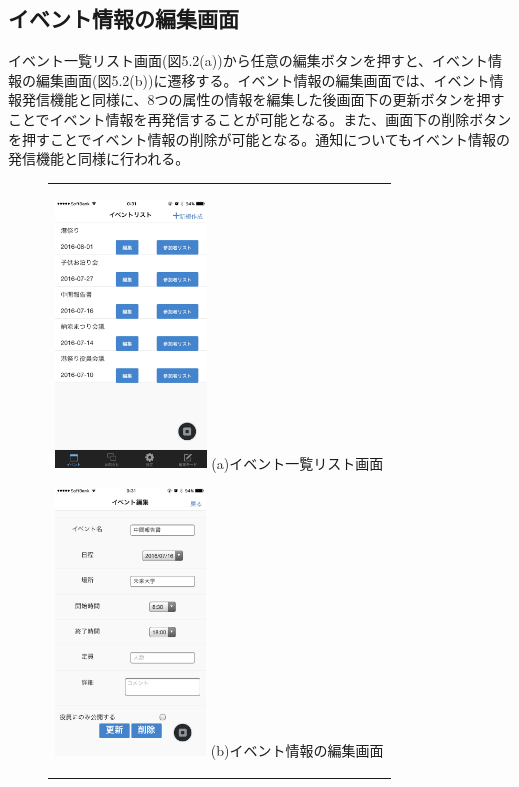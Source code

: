 \subsection{イベント情報の編集画面}%
イベント一覧リスト画面(図5.2(a))から任意の編集ボタンを押すと、イベント情報の編集画面(図5.2(b))に遷移する。イベント情報の編集画面では、イベント情報発信機能と同様に、8つの属性の情報を編集した後画面下の更新ボタンを押すことでイベント情報を再発信することが可能となる。また、画面下の削除ボタンを押すことでイベント情報の削除が可能となる。通知についてもイベント情報の発信機能と同様に行われる。

\begin{figure}[htbp]
  \begin{center}
    \begin{tabular}{c}

      \begin{minipage}{0.33\hsize}
        \begin{center}
\includegraphics[width=4cm]{event_list.PNG}
          \hspace{1cm} %
          {\footnotesize (a)イベント一覧リスト画面}
        \end{center}
      \end{minipage}

      \begin{minipage}{0.33\hsize}
        \begin{center}
\includegraphics[width=4cm]{event_edit.PNG}
          \hspace{1cm}%
          {\footnotesize (b)イベント情報の編集画面}
        \end{center}
      \end{minipage}


\end{tabular}
\end{center}
\end{figure}
